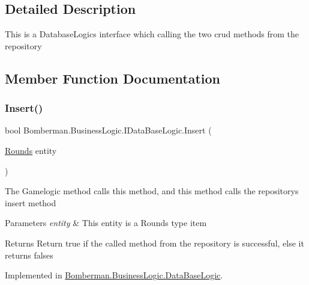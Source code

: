 \subsection{Detailed Description}
This is a Database\+Logic\textquotesingle{}s interface which calling the two crud methods from the repository 



\subsection{Member Function Documentation}
\mbox{\label{interface_bomberman_1_1_business_logic_1_1_i_data_base_logic_a1b8fde3e85c9ba91acbf4185a227f23b}} 
\subsubsection{\texorpdfstring{Insert()}{Insert()}}
{\footnotesize\ttfamily bool Bomberman.\+Business\+Logic.\+I\+Data\+Base\+Logic.\+Insert (\begin{DoxyParamCaption}\item[{\mbox{\hyperlink{class_bomberman_1_1_data_1_1_rounds}{Rounds}}}]{entity }\end{DoxyParamCaption})}



The Gamelogic method calls this method, and this method calls the repository\textquotesingle{}s insert method 


\begin{DoxyParams}{Parameters}
{\em entity} & This entity is a Rounds type item\\
\hline
\end{DoxyParams}
\begin{DoxyReturn}{Returns}
Return true if the called method from the repository is successful, else it returns falses
\end{DoxyReturn}


Implemented in \mbox{\hyperlink{class_bomberman_1_1_business_logic_1_1_data_base_logic_a6a7ca20f6210022d6b45d3aba0e17a62}{Bomberman.\+Business\+Logic.\+Data\+Base\+Logic}}.

\mbox{\label{interface_bomberman_1_1_business_logic_1_1_i_data_base_logic_aaa56c20c9b41d5f4a3c2522f450ecb41}} 
